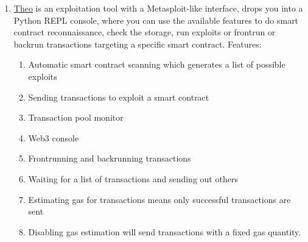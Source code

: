 \begin{enumerate}
\item\href{https://github.com/cleanunicorn/theo}{Theo} is an exploitation tool with a Metasploit-like interface, drops you into a Python REPL console, where you can use the available features to do smart contract reconnaissance, check the storage, run exploits or frontrun or backrun transactions targeting a specific smart contract. Features:
	\begin{enumerate}
	\item Automatic smart contract scanning which generates a list of possible exploits
	\item Sending transactions to exploit a smart contract
	\item Transaction pool monitor
	\item Web3 console
	\item Frontrunning and backrunning transactions
	\item Waiting for a list of transactions and sending out others
	\item Estimating gas for transactions means only successful transactions are sent
	\item Disabling gas estimation will send transactions with a fixed gas quantity.
	\end{enumerate}


\end{enumerate}
